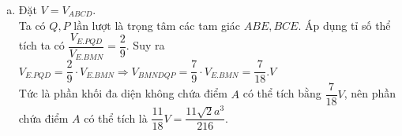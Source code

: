 \begin{bt}
{\begin{enumerate}[a.]
\begin{eqnarray*}
V_{EBMN}&=&\dfrac{1}{3} \cdot S_{BMN}d(E,(ABC))
= \dfrac{1}{3} \cdot \dfrac{1}{4} \cdot S_{\Delta ABC} \cdot 2 d(D,(ABC))\\
&=&\dfrac{1}{2} \cdot \dfrac{1}{3}S_{\Delta ABC} \cdot d(D,(ABC))
=\dfrac{1}{2}V_{ABCD}
\end{eqnarray*}
Vậy $\dfrac{V_{EBMN}}{V_{ABCD}}=\dfrac{1}{2}$.
\item   Đặt $V=V_{ABCD}$.\\
Ta có $Q, P$ lần lượt là trọng tâm các tam giác $ABE, BCE$.
Áp dụng tỉ số thể tích ta có $\dfrac{V_{E.PQD}}{V_{E.BMN}}=\dfrac{2}{9}$. Suy ra $V_{E.PQD}=\dfrac{2}{9}\cdot V_{E.BMN}\Rightarrow V_{BMNDQP}=\dfrac{7}{9}\cdot V_{E.BMN}=\dfrac{7}{18}.V$\\
	Tức là phần khối đa diện không chứa điểm $A$ có thể tích bằng $\dfrac{7}{18}V$, nên phần chứa điểm $A$ có thể tích là $\dfrac{11}{18}V=\dfrac{11\sqrt{2}a^3}{216}.$ 
\end{enumerate}
}
\end{bt}
